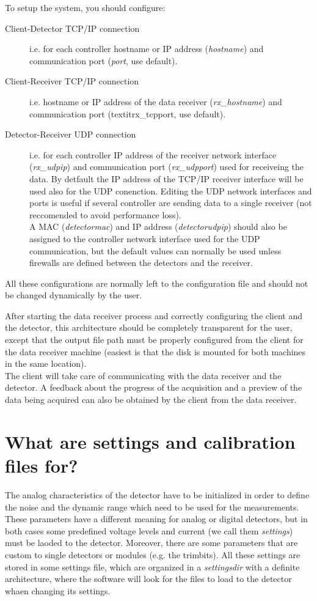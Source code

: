  
To setup the system, you should configure:
\begin{description}
\item[Client-Detector TCP/IP connection] i.e. for each controller hostname  or IP address  (\textit{hostname}) and communication port (\textit{port}, use default).
\item[Client-Receiver TCP/IP connection] i.e. hostname or IP address of the data receiver (\textit{rx\_hostname}) and communication port (textit{rx\_tcpport}, use default).
\item[Detector-Receiver UDP connection] i.e.  for each controller IP address of the receiver network interface (\textit{rx\_udpip}) and communication port (\textit{rx\_udpport}) used for receiveing the data. By detfault the IP address of the TCP/IP receiver interface will be used also for the UDP conenction. Editing the UDP network interfaces and ports is useful if several controller are sending data to a single receiver (not reccomended to avoid performance loss).\\
A MAC  (\textit{detectormac}) and IP address (\textit{detectorudpip}) should also be assigned to the controller network interface used for the UDP communication, but the default values can normally be used unless firewalls are defined between the detectors and the receiver.
\end{description}
All these configurations are normally left to the configuration file and should not be changed dynamically by the user.

After starting the data receiver process and correctly configuring the client and the detector, this architecture should be completely transparent for the user, except that the output file path must be properly configured from the client for the data receiver machine (easiest is that the disk is mounted for both machines in the same location).\\
The client will take care of communicating with the data receiver and the detector. A feedback about the progress of the acquisition and a preview of the data being acquired can also be obtained by the client from the data receiver.



\section{What are settings and calibration files for?} \label{sec:trimdir}

The analog characteristics of the detector have to be initialized in order to define the noise and the dynamic range which need to be used for the measurements. These parameters have a different meaning for analog or digital detectors, but in both cases some predefined voltage levels and current (we call them \textit{settings}) must be laoded to the detector. Moreover, there are some parameters that are custom to single detectors or modules (e.g. the trimbits). All these settings are stored in some settings file, which are organized in a \textit{settingsdir} with a definite architecture, where the software will look for the files to load to the detector whaen changing its settings.

